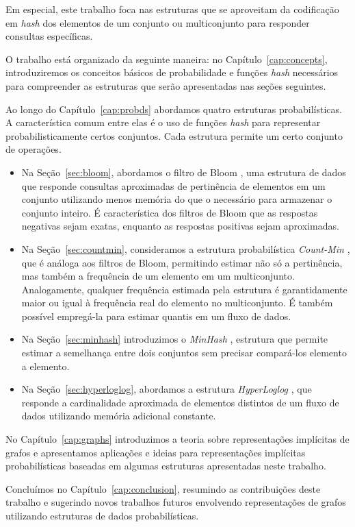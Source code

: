 Em especial, este trabalho foca nas estruturas que se aproveitam da codificação em \emph{hash} dos elementos de um conjunto ou multiconjunto para responder consultas específicas.

O trabalho está organizado da seguinte maneira: no Capítulo~\ref{cap:concepts}, introduziremos os conceitos básicos de probabilidade e funções \emph{hash} necessários para compreender as estruturas que serão apresentadas nas seções seguintes.

Ao longo do Capítulo~\ref{cap:probds} abordamos quatro estruturas probabilísticas. A característica comum entre elas é o uso de funções \emph{hash} para representar probabilisticamente certos conjuntos. Cada estrutura permite um certo conjunto de operações.

\begin{itemize}
  \item Na Seção~\ref{sec:bloom}, abordamos o filtro de Bloom \cite{bloom1970space}, uma estrutura de dados que responde consultas aproximadas de pertinência de elementos em um conjunto utilizando menos memória do que o necessário para armazenar o conjunto inteiro. É característica dos filtros de Bloom que as respostas negativas sejam exatas, enquanto as respostas positivas sejam aproximadas.
  
  \item Na Seção~\ref{sec:countmin}, consideramos a estrutura probabilística \emph{Count-Min} \cite{cormode2005improved}, que é análoga aos filtros de Bloom, permitindo estimar não só a pertinência, mas também a frequência de um elemento em um multiconjunto. Analogamente, qualquer frequência estimada pela estrutura é garantidamente maior ou igual à frequência real do elemento no multiconjunto. É também possível empregá-la para estimar quantis em um fluxo de dados.
  
  \item Na Seção~\ref{sec:minhash} introduzimos o \emph{MinHash} \cite{broder1997resemblance}, estrutura que permite estimar a semelhança entre dois conjuntos sem precisar compará-los elemento a elemento.
  
  \item Na Seção~\ref{sec:hyperloglog}, abordamos a estrutura \emph{HyperLoglog} \cite{flajolet2008hyperloglog}, que responde a cardinalidade aproximada de elementos distintos de um fluxo de dados utilizando memória adicional constante.
\end{itemize}

No Capítulo~\ref{cap:graphs} introduzimos a teoria sobre representações implícitas de grafos e apresentamos aplicações e ideias para representações implícitas probabilísticas baseadas em algumas estruturas apresentadas neste trabalho.

Concluímos no Capítulo~\ref{cap:conclusion}, resumindo as contribuições deste trabalho e sugerindo novos trabalhos futuros envolvendo representações de grafos utilizando estruturas de dados probabilísticas.


